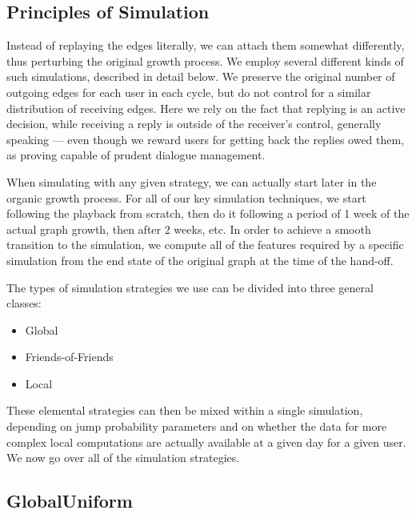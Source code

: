\documentclass[10pt,oneside]{memoir}
\begin{document}
\subsection{Principles of Simulation}
\label{principlesofsimulation}

Instead of replaying the edges literally, we can attach them somewhat differently, thus perturbing the original growth process.  We employ several different kinds of such simulations, described in detail below.  We preserve the original number of outgoing edges for each user in each cycle, but do not control for a similar distribution of receiving edges.  Here we rely on the fact that replying is an active decision, while receiving a reply is outside of the receiver's control, generally speaking --- even though we reward users for getting back the replies owed them, as proving capable of prudent dialogue management.


When simulating with any given strategy, we can actually start later in the organic growth process.  For all of our key simulation techniques, we start following the playback from scratch, then do it following a period of 1 week of the actual graph growth, then after 2 weeks, etc.  In order to achieve a smooth transition to the simulation, we compute all of the features required by a specific simulation from the end state of the original graph at the time of the hand-off.


The types of simulation strategies we use can be divided into three general classes:


\begin{itemize}


\item Global

\item Friends-of-Friends

\item Local
\end{itemize}

These elemental strategies can then be mixed within a single simulation, depending on jump probability parameters and on whether the data for more complex local computations are actually available at a given day for a given user.  We now go over all of the simulation strategies.


\pagebreak \subsection{GlobalUniform}
\label{globaluniform}
\end{document}
